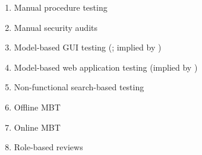 \begin{enumerate}
    \item Manual procedure testing \citep[p.~47]{Firesmith2015}
    \item Manual security audits \citep[p.~28]{Gerrard2000b}
    \item Model-based GUI testing (\citealp[Tab.~1]{DoğanEtAl2014}; implied by \citealp[p.~356]{SakamotoEtAl2013})
    \item Model-based web application testing (implied by \citealp[p.~356]{SakamotoEtAl2013})
    \item Non-functional search-based testing \citep[Tab.~1]{DoğanEtAl2014}
    \item Offline MBT \citepISTQB{}
    \item Online MBT \citepISTQB{}
    \item Role-based reviews \citepISTQB{}

\end{enumerate}

